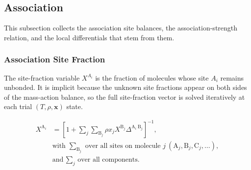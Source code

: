 \documentclass[12pt, letterpaper]{article}
\begin{document}
\subsection{Association}
\label{sec:association}

This subsection collects the association site balances, the association-strength relation, and the local differentials that stem from them.

\subsubsection{Association Site Fraction}

The site-fraction variable \(X^{A_i}\) is the fraction of molecules whose site \(A_i\) remains unbonded. It is implicit because the unknown site fractions appear on both sides of the mass-action balance, so the full site-fraction vector is solved iteratively at each trial \((T,\rho,\mathbf{x})\) state.

\begin{equation}
    \begin{aligned}
        X^{\mathrm{A}_{i}}
        &=\left[1+ \sum_{j} \sum_{\mathrm{B}_{j}} \rho x_{j}X^{\mathrm{B}_{j}} \Delta^{\mathrm{A}_{i} \mathrm{~B}_{j}}\right]^{-1},
        \\
        &\text{with }\sum_{\mathrm{B}_{j}}\text{ over all sites on molecule }j\ (\mathrm{A}_{j},\mathrm{B}_{j},\mathrm{C}_{j},\ldots),
        \\
        &\text{and }\sum_{j}\text{ over all components.}
    \end{aligned}
    \label{eq:x_assoc_site}
\end{equation}

\end{document}
